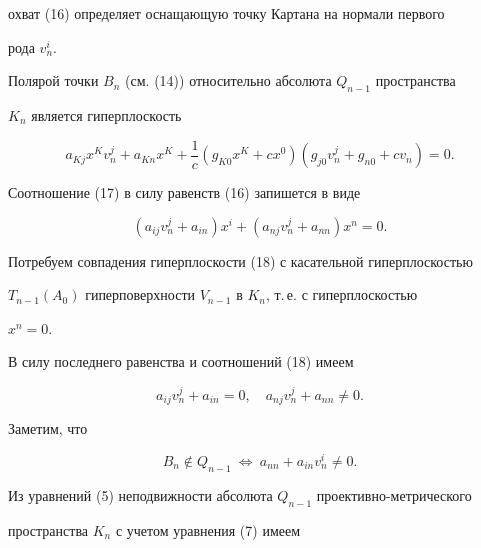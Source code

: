 охват (16) определяет оснащающую точку Картана на нормали первого 


рода $v^i_n$. 


 


Полярой точки $B_n$ (см. (14)) относительно абсолюта $Q_{n-1}$ пространства 


$K_n$ является гиперплоскость 


\begin{equation} 


a_{Kj}x^K v^j_n+a_{Kn}x^K+\frac{1}{c}(g_{K0}x^K+c x^0) 


(g_{j0}v^j_n+g_{n0}+c v_n)=0. 


\end{equation} 


Соотношение (17) в силу равенств (16) запишется в виде 


\begin{equation} 


(a_{ij}v^j_n+a_{in})x^i+(a_{nj}v^j_n+a_{nn})x^n=0. 


\end{equation} 


Потребуем совпадения гиперплоскости (18) с касательной гиперплоскостью 


$T_{n-1}(A_0)$ гиперповерхности $V_{n-1}$ в $K_n$, т.\,е. с гиперплоскостью 


$x^n=0$. 


В силу последнего равенства и соотношений (18) имеем 


\begin{equation} 


a_{ij}v^j_n+a_{in}=0,\quad a_{nj}v^j_n+a_{nn}\ne0. 


\end{equation} 


Заметим, что 


\begin{equation} 


B_n\notin Q_{n-1}\ \Leftrightarrow \ a_{nn}+a_{in}v^i_n\ne0. 


\end{equation} 


Из уравнений (5) неподвижности абсолюта $Q_{n-1}$ проективно-метрического 


пространства $K_n$ с учетом уравнения (7) имеем 



